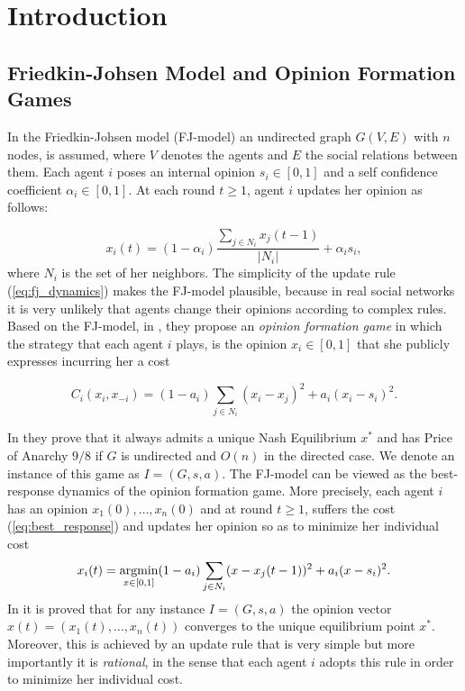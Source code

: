 \section{Introduction}

\subsection{Friedkin-Johsen Model and Opinion Formation Games}
In the Friedkin-Johsen model (FJ-model) an undirected graph $G(V,E)$ with $n$
nodes, is assumed, where $V$ denotes the agents and $E$ the social relations
between them. Each agent $i$ poses an internal opinion $s_i \in [0,1]$ and a self
confidence coefficient $\alpha_i \in[0,1]$. At each round $t \geq 1$,
agent $i$ updates her opinion as follows:

\begin{equation}\label{eq:fj_dynamics}
  x_i(t) = (1-\alpha_i) \frac{\sum_{j \in N_i}x_j(t-1)}{|N_i|} + \alpha_i s_i,
\end{equation}
where $N_i$ is the set of her neighbors. The simplicity of the update rule
(\ref{eq:fj_dynamics}) makes the FJ-model plausible, because in real social
networks it is very unlikely that agents change their opinions according
to complex rules.
Based on the FJ-model, in \cite{BKO11}, they propose an \emph{
  opinion formation game} in which the strategy that each agent
$i$ plays, is the opinion $x_i \in [0,1]$
that she publicly expresses incurring her a cost

\begin{equation}\label{eq:kleinberg_cost}
  C_i(x_i,x_{-i})=(1-a_i)\sum_{j \in N_i}(x_i -x_j)^2 + a_i(x_i-s_i)^2.
\end{equation}

In \cite{BK011} they prove that it always admits a unique
Nash Equilibrium $x^*$ and has Price of Anarchy $9/8$ if $G$ is
undirected and $O(n)$ in the directed case.  We denote an instance of this
game as $I=(G,s,a)$.
The FJ-model can be viewed as the best-response dynamics of the
opinion formation game.  More precisely, each agent $i$ has an opinion
$x_1(0),\ldots,x_n(0)$ and at round $t \geq 1$, suffers the cost
(\ref{eq:best_response}) and updates her opinion so as to minimize her
individual cost
%
\begin{equation}\label{eq:best_response}
  x_i(t) =
  \operatorname*{argmin}_{x \in [0,1]}
  (1-a_i) \sum_{j \in N_i} (x - x_j(t-1))^2 + a_i (x -s_i)^2.
\end{equation}
%
In \cite{GS14} it is proved that for any instance $I=(G,s,a)$ the opinion
vector $x(t)=(x_1(t),\ldots,x_n(t))$ converges to the unique equilibrium point
$x^*$. Moreover, this is achieved by an update rule that is very simple
but more importantly it is \emph{rational}, in the sense
that each agent $i$ adopts this rule in order to minimize her individual cost.

